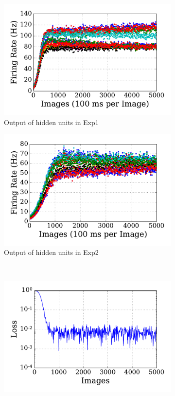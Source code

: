 \begin{figure}
\begin{subfigure}[t]{0.48\textwidth}
		\includegraphics[width=\textwidth]{pics_sdlm/03_exp_SAE_noise_long/exp1_hid_s.pdf}
		\caption{Output of hidden units in Exp1}
	\end{subfigure}
	\begin{subfigure}[t]{0.48\textwidth}
		\includegraphics[width=\textwidth]{pics_sdlm/03_exp_SAE_noise_long/exp2_hid_s.pdf}
		\caption{Output of hidden units in Exp2}
	\end{subfigure}\\
	\begin{subfigure}[t]{0.48\textwidth}
		\includegraphics[width=\textwidth]{pics_sdlm/03_exp_SAE_noise_long/exp1_mse_nons.pdf}

\end{subfigure}
\end{figure}
